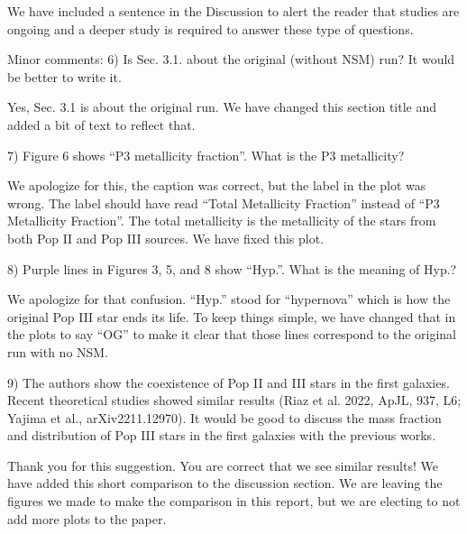 \documentclass[11pt]{article}
\begin{document}
We have included a sentence in the Discussion to alert the reader that studies are ongoing and a deeper study is required to answer these type of questions.

\begin{tcolorbox}[colback={lightgray}]
    Minor comments:
    6)      Is Sec. 3.1. about the original (without NSM) run? It would be better to write it.
\end{tcolorbox}

Yes, Sec. 3.1 is about the original run. We have changed this section title and added a bit of text to reflect that.

\begin{tcolorbox}[colback={lightgray}]
    7)      Figure 6 shows “P3 metallicity fraction”. What is the P3 metallicity?
\end{tcolorbox}

We apologize for this, the caption was correct, but the label in the plot was wrong. The label should have read ``Total Metallicity Fraction'' instead of ``P3 Metallicity Fraction''. The total metallicity is the metallicity of the stars from both Pop II and Pop III sources. We have fixed this plot.

\begin{tcolorbox}[colback={lightgray}]
    8)      Purple lines in Figures 3, 5, and 8 show “Hyp.”. What is the meaning of Hyp.?
\end{tcolorbox}

We apologize for that confusion. ``Hyp.'' stood for ``hypernova'' which is how the original Pop III star ends its life. To keep things simple, we have changed that in the plots to say ``OG'' to make it clear that those lines correspond to the original run with no NSM.

\begin{tcolorbox}[colback={lightgray}]
    9)      The authors show the coexistence of Pop II and III stars in the first galaxies. Recent theoretical studies showed similar results (Riaz et al. 2022, ApJL, 937, L6; Yajima et al., arXiv2211.12970). It would be good to discuss the mass fraction and distribution of Pop III stars in the first galaxies with the previous works. 
\end{tcolorbox}

Thank you for this suggestion. You are correct that we see similar results! We have added this short comparison to the discussion section. We are leaving the figures we made to make the comparison in this report, but we are electing to not add more plots to the paper.
\end{document}
